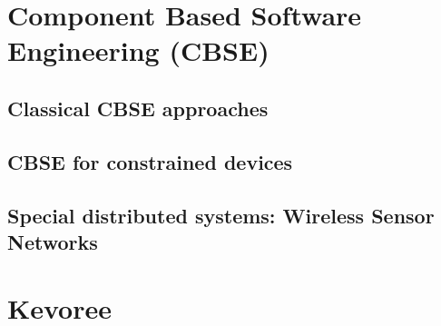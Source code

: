\section{Component Based Software Engineering (CBSE)}
\label{sec:CBSE}

\subsection{Classical CBSE approaches}

\subsection{CBSE for constrained devices}

\subsection{Special distributed systems: Wireless Sensor Networks}

\section{Kevoree}